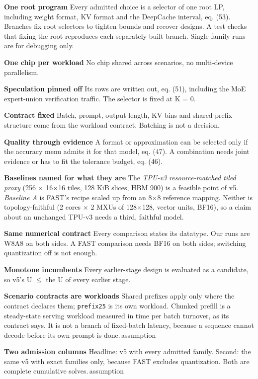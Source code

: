 \documentclass[10pt]{article}
\newcommand{\badge}[2]{{\footnotesize\sffamily\colorbox{#1bg}{\textcolor{#1}{\,#2\,}}}}
\renewcommand{\_}{\textunderscore\allowbreak}
\begin{document}
\begin{decisions}
 
\item \textbf{One root program} Every admitted choice is a selector of one root LP, including weight format, KV format and the DeepCache interval, eq. (53). Branches fix root selectors to tighten bounds and recover designs. A test checks that fixing the root reproduces each separately built branch. Single-family runs are for debugging only.
 
\item \textbf{One chip per workload} No chip shared across scenarios, no multi-device parallelism.
 
\item \textbf{Speculation pinned off} Its rows are written out, eq. (51), including the MoE expert-union verification traffic. The selector is fixed at K = 0.
 
\item \textbf{Contract fixed} Batch, prompt, output length, KV bins and shared-prefix structure come from the workload contract. Batching is not a decision.
 
\item \textbf{Quality through evidence} A format or approximation can be selected only if the accuracy menu admits it for that model, eq. (47). A combination needs joint evidence or has to fit the tolerance budget, eq. (46).
 
\item \textbf{Baselines named for what they are} The \emph{TPU-v3 resource-matched tiled proxy} (256 $\times$ 16$\times$16 tiles, 128 KiB slices, HBM 900) is a feasible point of v5. \emph{Baseline A} is FAST's recipe scaled up from an 8$\times$8 reference mapping. Neither is topology-faithful (2 cores $\times$ 2 MXUs of 128$\times$128, vector units, BF16), so a claim about an unchanged TPU-v3 needs a third, faithful model.
 
\item \textbf{Same numerical contract} Every comparison states its datatype. Our runs are W8A8 on both sides. A FAST comparison needs BF16 on both sides; switching quantization off is not enough.
 
\item \textbf{Monotone incumbents} Every earlier-stage design is evaluated as a candidate, so v5's U $\le$ the U of every earlier stage.
 
\item \textbf{Scenario contracts are workloads} Shared prefixes apply only where the contract declares them; \texttt{\_\_prefix25} is its own workload. Chunked prefill is a steady-state serving workload measured in time per batch turnover, as its contract says. It is not a branch of fixed-batch latency, because a sequence cannot decode before its own prompt is done.\hfill\badge{newc}{assumption}
 
\item \textbf{Two admission columns} Headline: v5 with every admitted family. Second: the same v5 with exact families only, because FAST excludes quantization. Both are complete cumulative solves.\hfill\badge{newc}{assumption}
 
\end{decisions}
   
\end{document}
